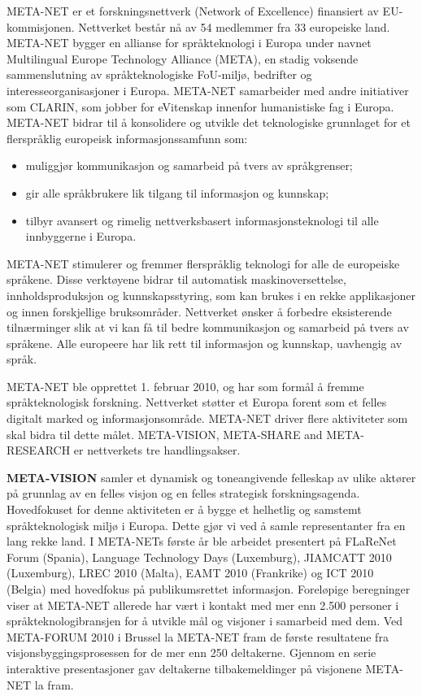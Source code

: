 \clearpage


\begin{multicols}{2}
META-NET er et forskningsnettverk (Network of Excellence) finansiert av EU-kommisjonen. Nettverket består nå av 54 medlemmer fra 33 europeiske land. 
META-NET bygger en allianse for språkteknologi i Europa under navnet Multilingual Europe Technology Alliance (META), en stadig voksende sammenslutning av språkteknologiske FoU-miljø, bedrifter og interesseorganisasjoner i Europa.
META-NET samarbeider med andre initiativer som CLARIN, som jobber for eVitenskap innenfor humanistiske fag i Europa. META-NET bidrar til å konsolidere og utvikle det teknologiske grunnlaget for et flerspråklig europeisk informasjonssamfunn som:

\begin{itemize}
\item muliggjør kommunikasjon og samarbeid på tvers av språkgrenser;
\item gir alle språkbrukere lik tilgang til informasjon og kunnskap;
\item tilbyr avansert og rimelig nettverksbasert informasjonsteknologi til alle innbyggerne i Europa.
\end{itemize}

META-NET stimulerer og fremmer flerspråklig teknologi for alle de europeiske språkene. Disse verktøyene bidrar til automatisk maskinoversettelse, innholdsproduksjon og kunnskapsstyring, som kan brukes i en rekke applikasjoner og innen forskjellige bruksområder. Nettverket ønsker å forbedre eksisterende tilnærminger slik at vi kan få til bedre kommunikasjon og samarbeid på tvers av språkene. Alle europeere har lik rett til informasjon og kunnskap, uavhengig av språk.

META-NET ble opprettet 1. februar 2010, og har som formål å fremme språkteknologisk forskning. Nettverket støtter et Europa forent som et felles digitalt marked og informasjonsområde. META-NET driver flere aktiviteter som skal bidra til dette målet. META-VISION, META-SHARE and META-RESEARCH er nettverkets tre handlingsakser. 

\textbf{META-VISION} samler et dynamisk og toneangivende felleskap av ulike aktører på grunnlag av en felles visjon og en felles strategisk forskningsagenda. Hovedfokuset for denne aktiviteten er å bygge et helhetlig og samstemt språkteknologisk miljø i Europa. Dette gjør vi ved å samle representanter fra en lang rekke land. I META-NETs første år ble arbeidet presentert på FLaReNet Forum (Spania), Language Technology Days (Luxemburg), JIAMCATT 2010 (Luxemburg), LREC 2010 (Malta), EAMT 2010 (Frankrike) og ICT 2010 (Belgia) med hovedfokus på publikumsrettet informasjon. Foreløpige beregninger viser at META-NET allerede har vært i kontakt med mer enn 2.500 personer i språkteknologibransjen for å utvikle mål og visjoner i samarbeid med dem. Ved META-FORUM 2010 i Brussel la META-NET fram de første resultatene fra visjonsbyggingsprosessen for de mer enn 250 deltakerne. Gjennom en serie interaktive presentasjoner gav deltakerne tilbakemeldinger på visjonene META-NET la fram.


\end{multicols}
